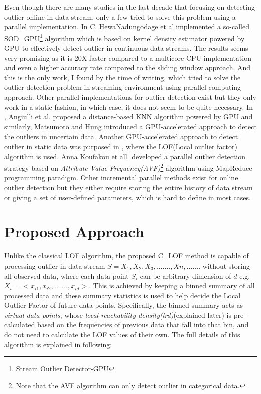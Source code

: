 \documentclass[11pt]{article}       %
\begin{document}
Even though there are many studies in the last decade that focusing on detecting outlier online in data stream, only a few tried to solve this problem using a parallel implementation. In \cite{7516110} C. HewaNadungodage et al.implemented a so-called SOD\_GPU\footnote{Stream Outlier Detector-GPU} algorithm which is based on kernel density estimator powered by GPU to effectively detect outlier in continuous data streams. The results seems very promising as it is 20X faster compared to a multicore CPU implementation and even a higher accuracy rate compared to the sliding window approach. And this is the only work, I found by the time of writing, which tried to solve the outlier detection problem in streaming environment using parallel computing approach. Other parallel implementations for outlier detection exist but they only work in a static fashion, in which case, it does not seem to be quite necessary. In \cite{6641405},  Angiulli et al. proposed a distance-based KNN algorithm powered by GPU and similarly, Matsumoto and Hung\cite{Matsumoto2012} introduced a GPU-accelerated approach to detect the outliers in uncertain data. Another GPU-accelerated approach to detect outlier in static data was purposed in \cite{Alshawabkeh:2010:ALO:1735688.1735707}, where the LOF(Local outlier factor) algorithm is used. Anna Koufakou et all.\cite{4634266} developed a parallel outlier detection strategy based on \textit{Attribute Value Frequency(AVF)}\cite{4410382}\footnote{Note that the AVF algorithm can only detect outlier in categorical data.} algorithm using MapReduce programming paradigm. Other incremental parallel methods exist for online outlier detection but they either require storing the entire history of data stream or giving a set of user-defined parameters, which is hard to define in most cases. 

\section{Proposed Approach} \label{proapp}

Unlike the classical LOF algorithm, the proposed C\_LOF method is capable of processing outlier in data stream $S = {X_1, X_2, X_3, ......., Xn, .......}$ without storing all observed data, where each data point $S_i$ can be arbitrary dimension of $d$ e.g. $X_i = <x_{i1}, x_{i2}, ......., x_{id}>$. This is achieved by keeping a binned summary of all processed data and these summary statistics is used to help decide the Local Outlier Factor of future data points. Specifically, the binned summary acts as \textit{virtual data points}, whose \textit{local reachability density(lrd)}(explained later) is pre-calculated based on the frequencies of previous data that fall into that bin, and do not need to calculate the LOF values of their own. The full details of this algorithm is explained in following:
\end{document}
